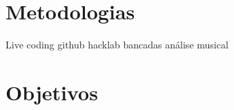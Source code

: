 \documentclass[
	12pt,				%
	openright,			%
	twoside,			%
	a4paper,			%
	english,			%
	french,				%
	spanish,			%
	brazil,				%
	]{abntex2}
\begin{document}
\chapter{Metodologias}


Live coding
github
hacklab
bancadas
análise musical

\chapter{Objetivos}


\cite{brinkmann2011embedding}






%
%






\end{document}
